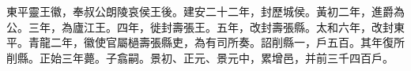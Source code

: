 \begin{pinyinscope}
 
 
 東平靈王徽，奉叔公朗陵哀侯王後。建安二十二年，封歷城侯。黃初二年，進爵為公。三年，為廬江王。四年，徙封壽張王。五年，改封壽張縣。太和六年，改封東平。青龍二年，徽使官屬檛壽張縣吏，為有司所奏。詔削縣一，戶五百。其年復所削縣。正始三年薨。子翕嗣。景初、正元、景元中，累增邑，并前三千四百戶。
 
 
 
 
\end{pinyinscope}